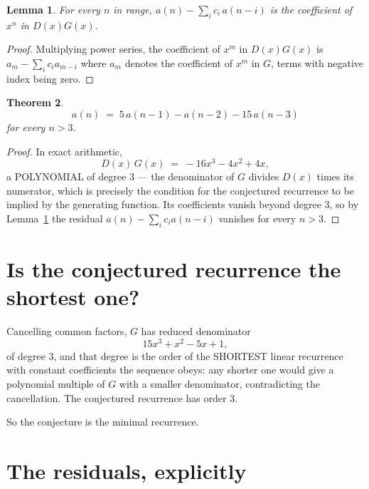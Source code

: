 \documentclass[11pt,a4paper]{article}
\theoremstyle{plain}
\newtheorem{theorem}{Theorem}
\newtheorem{lemma}[theorem]{Lemma}
\theoremstyle{definition}
\begin{document}
\begin{lemma}\label{lem:key}
For every $n$ in range, $a(n)-\sum_i c_i\,a(n-i)$ is the coefficient of $x^{n}$ in
$D(x)G(x)$.
\end{lemma}

\begin{proof}
Multiplying power series, the coefficient of $x^{m}$ in $D(x)G(x)$ is
$a_m-\sum_i c_i a_{m-i}$ where $a_m$ denotes the coefficient of $x^{m}$ in $G$, terms with
negative index being zero.
\end{proof}

\begin{theorem}
\[
a(n)\;=\;5\,a(n-1) - a(n-2) - 15\,a(n-3)
\]
for every $n>3$.
\end{theorem}

\begin{proof}
In exact arithmetic,
\[
D(x)\,G(x)\;=\;- 16 x^{3} - 4 x^{2} + 4 x,
\]
a POLYNOMIAL of degree $3$ --- the denominator of $G$ divides $D(x)$ times its numerator,
which is precisely the condition for the conjectured recurrence to be implied by the
generating function. Its coefficients vanish beyond degree $3$, so by
Lemma~\ref{lem:key} the residual $a(n)-\sum_ic_ia(n-i)$ vanishes for every
$n>3$.
\end{proof}

\section{Is the conjectured recurrence the shortest one?}

Cancelling common factors, $G$ has reduced denominator
\[
15 x^{3} + x^{2} - 5 x + 1,
\]
of degree $3$, and that degree is the order of the SHORTEST linear recurrence with
constant coefficients the sequence obeys: any shorter one would give a polynomial multiple of
$G$ with a smaller denominator, contradicting the cancellation. The conjectured recurrence has
order $3$.

So the conjecture is the minimal recurrence.

\section{The residuals, explicitly}
\end{document}
